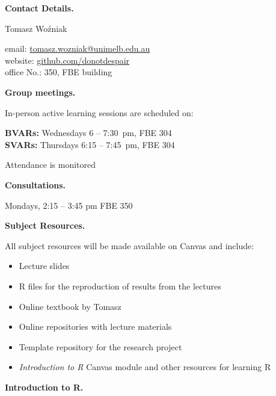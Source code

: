 \documentclass[10pt]{article}
\begin{document}
\bigskip\begin{multicols}{2}

\vspace{0.3cm}\noindent\textbf{Contact Details.} 

\smallskip\indent Tomasz Wo\'zniak 

\smallskip\indent email: \href{mailto:tomasz.wozniak@unimelb.edu.au}{tomasz.wozniak@unimelb.edu.au}\\
\indent website: \href{https://github.com/donotdespair}{github.com/donotdespair}\\
\indent office No.: 350, FBE building


%
%
%

\bigskip\noindent\textbf{Group meetings.}

\smallskip\noindent In-person active learning sessions are scheduled on:

\smallskip\indent\textbf{BVARs:} Wednesdays 6 -- 7:30~pm, FBE 304 \\
\indent\textbf{SVARs:} Thursdays 6:15 -- 7:45~pm, FBE 304

\smallskip\noindent Attendance is monitored


\bigskip\noindent\textbf{Consultations.} 

\smallskip\indent Mondays, 2:15 -- 3:45 pm FBE 350


\bigskip\noindent\textbf{Subject Resources.}

\smallskip\noindent All subject resources will be made available on Canvas and include:
\begin{itemize}[itemsep=0pt]
\item Lecture slides
\item R files for the reproduction of results from the lectures
\item Online textbook by Tomasz
\item Online repositories with lecture materials
\item Template repository for the research project
\item \textit{Introduction to R} Canvas module and other resources for learning R
\end{itemize}


\bigskip\noindent\textbf{Introduction to R.} 


\end{multicols}
\end{document}
